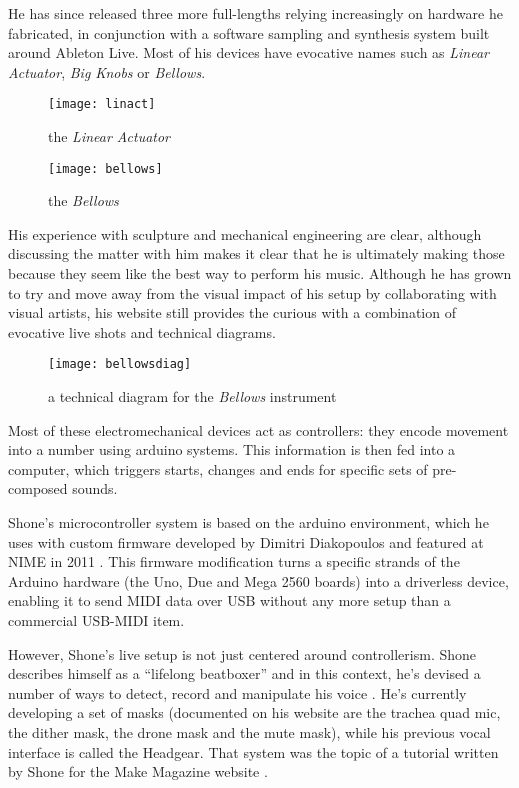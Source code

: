 He has since released three more full-lengths relying increasingly on hardware he fabricated, in conjunction with a software sampling and synthesis system built around Ableton Live. Most of his devices have evocative names such as \emph{Linear Actuator}, \emph{Big Knobs} or \emph{Bellows}. 

	\begin{figure}[h!]
	  \caption{the \emph{Linear Actuator}}
	  \centering
	    \texttt{[image: linact]}
	\end{figure}

	\begin{figure}[h!]
	  \caption{the \emph{Bellows}}
	  \centering
	    \texttt{[image: bellows]}
	\end{figure}

His experience with sculpture and mechanical engineering are clear, although discussing the matter with him makes it clear that he is ultimately making those because they seem like the best way to perform his music. Although he has grown to try and move away from the visual impact of his setup by collaborating with visual artists, his website still provides the curious with a combination of evocative live shots and technical diagrams. 

	\begin{figure}[h!]
	  \caption{a technical diagram for the \emph{Bellows} instrument}
	  \centering
	    \texttt{[image: bellowsdiag]}
	\end{figure}
	
Most of these electromechanical devices act as controllers: they encode movement into a number using arduino systems. This information is then fed into a computer, which triggers starts, changes and ends for specific sets of pre-composed sounds. 

Shone's microcontroller system is based on the arduino environment, which he uses with custom firmware developed by Dimitri Diakopoulos and featured at NIME in 2011 \citep{diakopoulos2011,diakopoulos2015} . This firmware modification turns a specific strands of the Arduino hardware (the Uno, Due and Mega 2560 boards) into a driverless device, enabling it to send MIDI data over USB without any more setup than a commercial USB-MIDI item. 

However, Shone's live setup is not just centered around controllerism. Shone describes himself as a ``lifelong beatboxer'' and in this context, he's devised a number of ways to detect, record and manipulate his voice \citep{shone2012}. He's currently developing a set of masks (documented on his website are the trachea quad mic, the dither mask, the drone mask and the mute mask), while his previous vocal interface is called the Headgear. That system was the topic of a tutorial written by Shone for the Make Magazine website \citep{shone2012}. 

